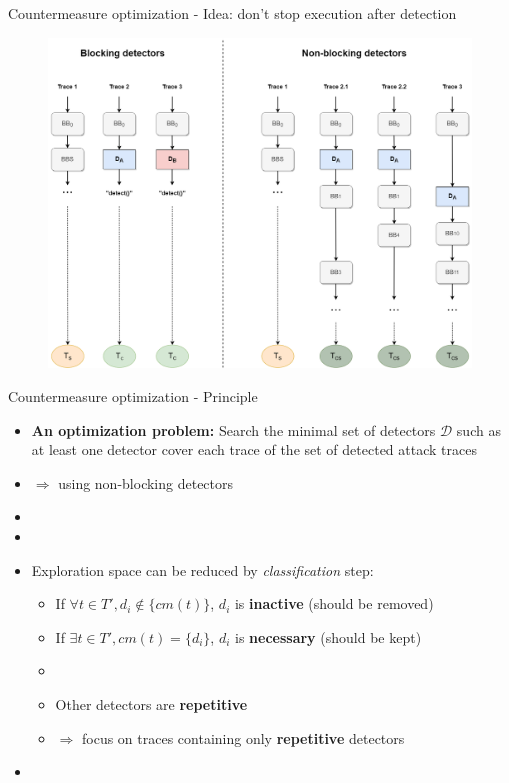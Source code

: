 \begin{frame}[fragile]{Countermeasure optimization - Idea: don't stop execution after detection }
\begin{tiny}
{\begin{figure}
                    \includegraphics[scale=0.14]{img/CCP-prop-stopping2-en-DA.drawio.png}
                \end{figure}
        }
    \end{tiny}
\end{frame}

\begin{frame}[fragile]{Countermeasure optimization - Principle} 
    \begin{small}
        \begin{itemize}
            \item \textbf{An optimization problem:} Search the minimal set of detectors $\mathcal{D}$ such as at least one detector cover each trace of the set of detected attack traces
            \item[] $\Rightarrow$ using non-blocking detectors
            \item[] 
            \item[] 
            \item Exploration space can be reduced by \textit{classification} step:
            \begin{itemize}
                \item If $\forall t \in T', d_i \notin \{cm(t)\}$, $d_i$ is \textbf{inactive} (should be removed)
                \item If $\exists t \in T', cm(t) = \{d_i\}$, $d_i$ is \textbf{necessary} (should be kept)
                \item[] 
                \item Other detectors are \textbf{repetitive}
                \item[] $\Rightarrow$ focus on traces containing only \textbf{repetitive} detectors
            \end{itemize}
            \item[]            
        \end{itemize}
    \end{small}
\end{frame}


